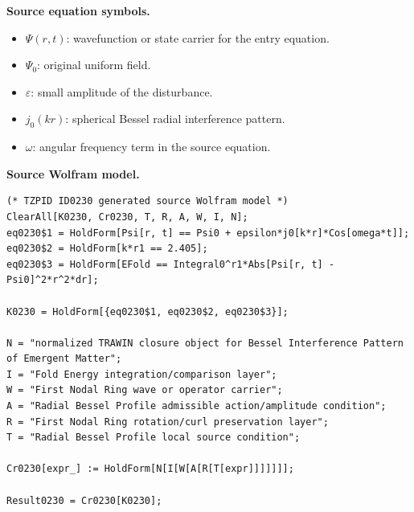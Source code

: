 \begin{minipage}[t]{0.49\linewidth}
\begingroup
\small
\raggedright
\textbf{Source equation symbols.}\par
\begin{itemize}[leftmargin=1.35em,itemsep=1pt,topsep=1pt,parsep=0pt]
    \item $\Psi(r,t)$: wavefunction or state carrier for the entry equation.
    \item $\Psi_0$: original uniform field.
    \item $\varepsilon$: small amplitude of the disturbance.
    \item $j_0(kr)$: spherical Bessel radial interference pattern.
    \item $\omega$: angular frequency term in the source equation.
\end{itemize}
\endgroup
\end{minipage}\hfill
\begin{minipage}[t]{0.47\linewidth}
\begingroup
\scriptsize
\raggedright
\textbf{Source Wolfram model.}\par
\begin{Verbatim}[fontsize=\tiny,breaklines=true,breakanywhere=true]
(* TZPID ID0230 generated source Wolfram model *)
ClearAll[K0230, Cr0230, T, R, A, W, I, N];
eq0230$1 = HoldForm[Psi[r, t] == Psi0 + epsilon*j0[k*r]*Cos[omega*t]];
eq0230$2 = HoldForm[k*r1 == 2.405];
eq0230$3 = HoldForm[EFold == Integral0^r1*Abs[Psi[r, t] - Psi0]^2*r^2*dr];

K0230 = HoldForm[{eq0230$1, eq0230$2, eq0230$3}];

N = "normalized TRAWIN closure object for Bessel Interference Pattern of Emergent Matter";
I = "Fold Energy integration/comparison layer";
W = "First Nodal Ring wave or operator carrier";
A = "Radial Bessel Profile admissible action/amplitude condition";
R = "First Nodal Ring rotation/curl preservation layer";
T = "Radial Bessel Profile local source condition";

Cr0230[expr_] := HoldForm[N[I[W[A[R[T[expr]]]]]]];

Result0230 = Cr0230[K0230];
\end{Verbatim}
\endgroup
\end{minipage}

